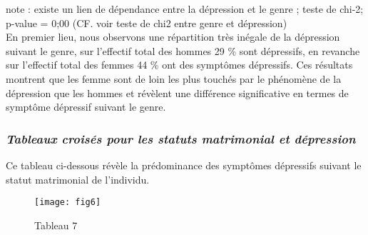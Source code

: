 \documentclass[a4paper]{article}
\begin{document}
note : existe un lien de dépendance entre la dépression et le genre ; teste de chi-2; p-value = 0;00 (CF. voir teste de chi2 entre genre et dépression) \\
En premier lieu, nous observons une répartition très inégale de la dépression suivant le genre, sur l’effectif total des hommes 29 \% sont dépressifs, en revanche sur l’effectif total des femmes 44 \% ont des symptômes dépressifs. Ces résultats montrent que les femme sont de loin les plus touchés par le phénomène de la dépression que les hommes et révèlent une différence significative en termes de symptôme dépressif suivant le genre.\\
 \subsubsection{\textit{Tableaux croisés pour les statuts matrimonial et dépression}} 
Ce tableau ci-dessous révèle  la prédominance des symptômes dépressifs suivant le statut matrimonial de l’individu.

\begin{figure}[h!]
	\centering
	\texttt{[image: fig6]}
	\caption{Tableau 7}
	\label{fig:fig6}
\end{figure}
\end{document}

